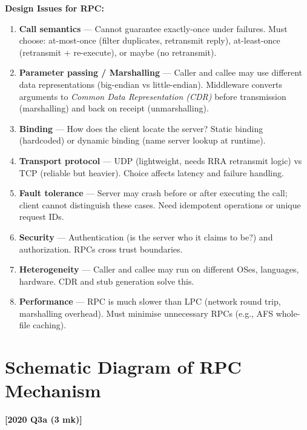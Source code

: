\documentclass[11pt,a4paper]{article}
\newcommand{\qref}[1]{\textbf{\textcolor{examblue}{[#1]}}}
\newcommand{\mk}[1]{\textcolor{slidegray}{\small(#1 mk)}}
\newcommand{\key}[1]{\textbf{\textcolor{keyred}{#1}}}
\begin{document}
\begin{answerbox}
\textbf{Design Issues for RPC:}
\begin{enumerate}
  \item \key{Call semantics} --- Cannot guarantee exactly-once under failures. Must choose: at-most-once (filter duplicates, retransmit reply), at-least-once (retransmit + re-execute), or maybe (no retransmit).
  \item \key{Parameter passing / Marshalling} --- Caller and callee may use different data representations (big-endian vs little-endian). Middleware converts arguments to \emph{Common Data Representation (CDR)} before transmission (marshalling) and back on receipt (unmarshalling).
  \item \key{Binding} --- How does the client locate the server? Static binding (hardcoded) or dynamic binding (name server lookup at runtime).
  \item \key{Transport protocol} --- UDP (lightweight, needs RRA retransmit logic) vs TCP (reliable but heavier). Choice affects latency and failure handling.
  \item \key{Fault tolerance} --- Server may crash before or after executing the call; client cannot distinguish these cases. Need idempotent operations or unique request IDs.
  \item \key{Security} --- Authentication (is the server who it claims to be?) and authorization. RPCs cross trust boundaries.
  \item \key{Heterogeneity} --- Caller and callee may run on different OSes, languages, hardware. CDR and stub generation solve this.
  \item \key{Performance} --- RPC is much slower than LPC (network round trip, marshalling overhead). Must minimise unnecessary RPCs (e.g., AFS whole-file caching).
\end{enumerate}
\end{answerbox}

\section{Schematic Diagram of RPC Mechanism}
\qref{2020 Q3a \mk{3}}
\end{document}
